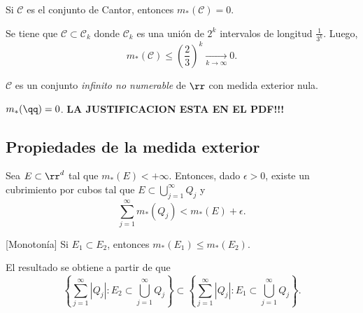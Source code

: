     \begin{ejemplo}{}
    Si $\mathscr{C}$ es el conjunto de Cantor, entonces $m_{*}(\mathscr{C})=0$.
    \begin{demo}
    Se tiene que $\mathscr{C}\subset \mathscr{C}_k$ donde $\mathscr{C}_k$ es una uni\'on de $2^k$ intervalos de longitud $\frac{1}{3^k}$. 
    Luego, 
    \[
    m_{*}(\mathscr{C})\leq \left(\frac{2}{3}\right)^k \xrightarrow[k \to \infty]{}0.
    \]
    \end{demo}
    $\mathscr{C}$ es un  conjunto \emph{infinito no numerable} de $\rr$     con medida exterior nula.
    \end{ejemplo}
    
    \begin{ejemplo}{}
    $m_{*}(\qq)=0$.
    \textbf{LA JUSTIFICACION ESTA EN EL PDF!!!}
    \end{ejemplo}
    
    \subsection{Propiedades de la medida exterior}
    
    \begin{observacion}{}
    Sea $E \subset \rr^d$ tal que  $m_*(E)<+\infty$. 
    Entonces, dado $\epsilon>0$, existe un cubrimiento por cubos  tal que $E \subset \bigcup\limits_{j=1}^{\infty} Q_j$ y 
    \[
    \sum\limits_{j=1}^{\infty} m_{*}(Q_j)< m_{*}(E)+\epsilon.
    \]
 
    \end{observacion}
        
    \begin{observacion}{}[Monoton\'ia]
    Si $E_1\subset E_2$, entonces $m_{*}(E_1)\leq m_{*}(E_2)$.
    
    El resultado se obtiene a partir de que 
    \[
   \left \{ \sum\limits_{j=1}^{\infty} |Q_j|: E_2\subset \bigcup\limits_{j=1}^{\infty} Q_j
    \right\}
    \subset
     \left\{ \sum\limits_{j=1}^{\infty} |Q_j|: E_1\subset \bigcup\limits_{j=1}^{\infty} Q_j
    \right\}.
    \]
    \end{observacion}
    
